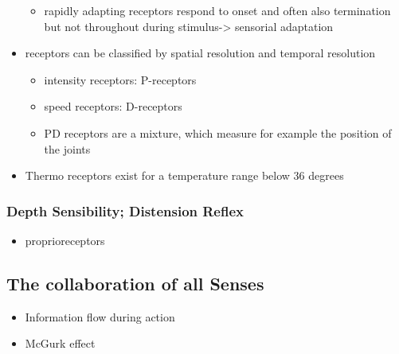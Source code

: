 \documentclass{standalone}
\begin{document}
\begin{itemize}
	\begin{itemize}
		\item rapidly adapting receptors respond to onset and often also termination but not throughout during stimulus-> sensorial adaptation
	\end{itemize}
	\item receptors can be classified by spatial resolution and temporal resolution
	\begin{itemize}
		\item intensity receptors: P-receptors
		\item speed receptors: D-receptors
		\item PD receptors are a mixture, which measure for example the position of the joints
	\end{itemize}
	\item Thermo receptors exist for a temperature range below 36 degrees
\end{itemize}
\subsubsection{Depth Sensibility; Distension Reflex}
\begin{itemize}
	\item proprioreceptors
\end{itemize}
\subsection{The collaboration of all Senses}
\begin{itemize}
	\item Information flow during action
	\item McGurk effect
\end{itemize}
\end{document}
